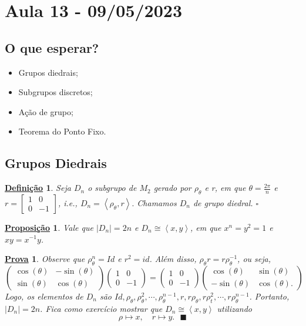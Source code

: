 \documentclass{article}
\newtheorem*{def*}{\underline{Defini\c c\~ao}}
\newtheorem*{prop*}{\underline{Proposi\c c\~ao}}
\newtheorem*{proof*}{\underline{Prova}}
\renewcommand\qedsymbol{$\blacksquare$}
\begin{document}
\section{Aula 13 - 09/05/2023}
\subsection{O que esperar?}
\begin{itemize}
  \item Grupos diedrais;
  \item Subgrupos discretos;
  \item A\c cão de grupo;
  \item Teorema do Ponto Fixo.
\end{itemize}
\subsection{Grupos Diedrais}
\begin{def*}
  Seja \(D_{n}\) o subgrupo de \(M_{2}\) gerado por \(\rho _{\theta }\) e r,
  em que \(\theta =\frac{2\pi }{n}\) e \(r = \begin{bmatrix}
    1 & 0 \\
    0 & -1
  \end{bmatrix}\), i.e., \(D_{n}=\left< \rho _{\theta }, r \right>.\) Chamamos
  \(D_{n}\) de grupo diedral. \(\square\)
\end{def*} 
\begin{prop*}
  Vale que \(|D_{n}|=2n\) e \(D_{n}\cong{\left< x, y \right>}\), em que \(x^{n} = y^2=1\) e
  \(xy=x^{-1}y\).
\end{prop*}
\begin{proof*}
  Observe que \(\rho _{\theta }^{n} = Id\) e \(r^2 = id\). Além disso, \(\rho _{\theta }r = r\rho_{\theta }^{-1}\), ou seja, 
    \[
      \begin{pmatrix}
        \cos{(\theta )} & -\sin{(\theta )}\\
        \sin{(\theta )} & \cos{(\theta )}
      \end{pmatrix}\begin{pmatrix}
        1 & 0 \\
        0 & -1
      \end{pmatrix} = \begin{pmatrix}
        1 & 0 \\
        0 & -1
      \end{pmatrix}\begin{pmatrix}
        \cos{(\theta )} & \sin{(\theta )}\\
        -\sin{(\theta )} & \cos{(\theta )}.
      \end{pmatrix}
    \]
    Logo, os elementos de \(D_{n}\) são \(Id, \rho _{\theta }, \rho _{\theta }^2, \cdots, \rho _{\theta }^{n-1},
    r, r\rho _{\theta }, r\rho _{t}^{2}, \cdots, r\rho _{\theta }^{n-1}\). Portanto,
    \(|D_{n}| = 2n\). Fica como exercício mostrar que \(D_{n}\cong{\left< x, y \right>}\) utilizando 
      \[
        \rho \mapsto x, \quad r\mapsto y.\text{ \qedsymbol}
      \]
\end{proof*}
\end{document}
